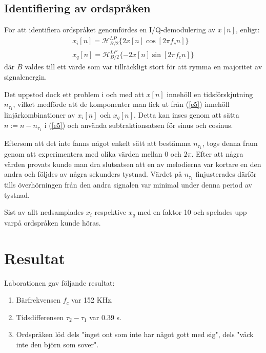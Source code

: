 \documentclass[10pt,twocolumn,a4paper]{article}
\begin{document}
\subsection{Identifiering av ordspråken}

För att identifiera ordspråket genomfördes en I/Q-demodulering av $x[n]$,
enligt:
\begin{multline}
    x_i[n] = \mathcal{H}_{B/2}^{LP} \{ 2 x[n] \cos[2 \pi f_c n] \} \\
    x_q[n] = \mathcal{H}_{B/2}^{LP} \{ -2 x[n] \sin[2 \pi f_c n] \}
    \label{e5}
\end{multline}
där $B$ valdes till ett värde som var tillräckligt stort för att rymma en
majoritet av signalenergin.

Det uppstod dock ett problem i och med att $x[n]$ innehöll en tidsförskjutning
$n_{\tau_1}$, vilket medförde att de komponenter man fick ut från (\ref{e5})
innehöll linjärkombinationer av $x_i[n]$ och $x_q[n]$. Detta kan inses genom
att sätta $n := n - n_{\tau_1}$ i (\ref{e5}) och använda subtraktionsatsen för
sinus och cosinus.

Eftersom att det inte fanns något enkelt sätt att bestämma $n_{\tau_1}$, togs
denna fram genom att experimentera med olika värden mellan $0$ och $2 \pi$.
Efter att några värden provats kunde man dra slutsatsen att en av melodierna
var kortare en den andra och följdes av några sekunders tystnad. Värdet på
$n_{\tau_1}$ finjusterades därför tills överhörningen från den andra signalen
var minimal under denna period av tystnad.

Sist av allt nedsamplades $x_i$ respektive $x_q$ med en faktor 10 och spelades
upp varpå ordspråken kunde höras.
\section{Resultat}

Laborationen gav följande resultat:
\begin{enumerate}
\item Bärfrekvensen $f_c$ var 152 KHz. 
\item Tidsdifferensen $\tau_2 - \tau_1$ var 0.39 s.
\item Ordspråken löd dels "inget ont som inte har något gott med sig", dels "väck inte den björn som sover".
\end{enumerate}

\clearpage
\end{document}
